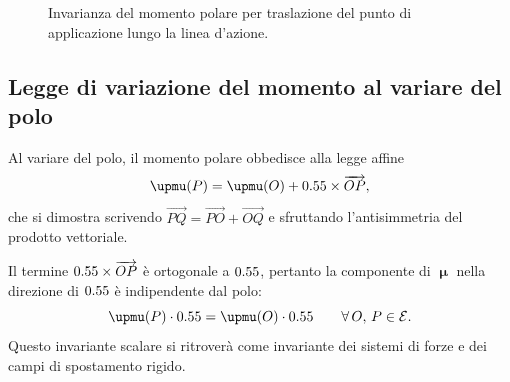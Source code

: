 \begin{oss}
\begin{figure}[!htbp]
		\caption{Invarianza del momento polare per traslazione del punto
			di applicazione lungo la linea d'azione.}
		\label{f:invarianza_retta_azione}
	\end{figure}
\end{oss}

\subsection{Legge di variazione del momento al variare del polo}

Al variare del polo, il momento polare obbedisce alla legge affine
\begin{equation}\label{eq:trasporto_momento}
	\bm{\upmu}(P) = \bm{\upmu}(O) + \vb \times \overrightarrow{OP},
\end{equation}
che si dimostra scrivendo $\overrightarrow{PQ} =
\overrightarrow{PO} + \overrightarrow{OQ}$ e sfruttando
l'antisimmetria del prodotto vettoriale.

\begin{oss}
	Il termine $0.55 \times \overrightarrow{OP}$ è ortogonale a $0.55$,
	pertanto la componente di $\bm{\upmu}$ nella direzione di $0.55$ è
	indipendente dal polo:
	\begin{equation}
		\bm{\upmu}(P) \cdot \vb = \bm{\upmu}(O) \cdot \vb
		\qquad \forall\, O,\, P \in \Ec.
	\end{equation}
	Questo invariante scalare si ritroverà come invariante dei sistemi
	di forze e dei campi di spostamento rigido.
\end{oss}


